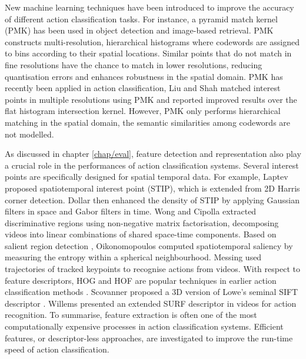 New machine learning techniques have been introduced to improve the accuracy of different action classification tasks.  
For instance, a pyramid match kernel (PMK) \cite{Grauman2005} has been used in object detection and image-based retrieval. PMK constructs multi-resolution, hierarchical histograms where codewords are assigned to bins according to their spatial locations. Similar points that do not match in fine resolutions have the chance to match in lower resolutions, reducing quantisation errors and enhances robustness in the spatial domain. PMK has recently been applied in action classification, Liu and Shah \cite{Liu2008} matched interest points in multiple resolutions using PMK and reported improved results over the flat histogram intersection kernel. 
However, PMK only performs hierarchical matching in the spatial domain, the semantic similarities among codewords are not modelled.  

As discussed in chapter \ref{chap/eval}, feature detection and representation also play a crucial role in the performances of action classification systems. Several interest points are specifically designed for spatial temporal data. For example, Laptev \cite{Laptev2005} proposed spatiotemporal interest point (STIP), which is extended from 2D Harris corner detection. Dollar \etal \cite{Dollar2005} then enhanced the density of STIP by applying Gaussian filters in space and Gabor filters in time.  
Wong and Cipolla \cite{Wong2007a} extracted discriminative regions using non-negative matrix factorisation, decomposing videos into linear combinations of shared space-time components.
Based on salient region detection \cite{Mikolajczyk2004}, Oikonomopoulos \etal \cite{Oikonomopoulos2005} computed spatiotemporal saliency by measuring the entropy within a spherical neighbourhood. Messing \etal \cite{Messing2009} used trajectories of tracked keypoints to recognise actions from videos. 
With respect to feature descriptors, HOG and HOF are popular techniques in earlier action classification methods \cite{Dollar2005, Niebles2008, Schuldt2004}. Scovanner \etal \cite{Scovanner2007} proposed a 3D version of Lowe's seminal SIFT descriptor \cite{Lowe2004}. Willems \etal \cite{Willems2009} presented an extended SURF descriptor in videos for action recognition.  
To summarise, feature extraction is often one of the most computationally expensive processes in action classification systems. Efficient features, or descriptor-less approaches, are investigated to improve the run-time speed of action classification.  

